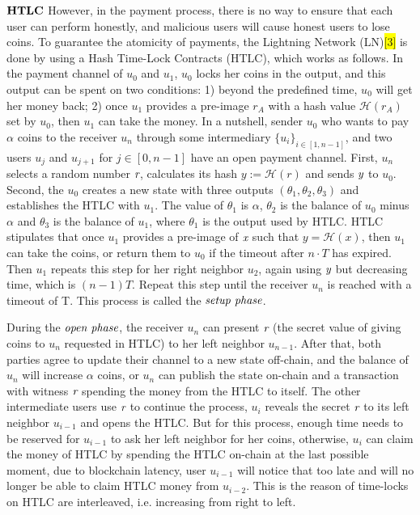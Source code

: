 \documentclass[conference]{IEEEtran}
\begin{document}
\noindent $\bf{HTLC}$ However, in the payment process, there is no way to ensure that each user can perform honestly, and malicious 
users will cause honest users to lose coins. To guarantee the atomicity of payments, the Lightning Network (LN)\colorbox{yellow}{[3]} 
is done by using a Hash Time-Lock Contracts (HTLC), which works as follows. In the payment channel of $u_0$ and $u_1$, $u_0$ locks her 
coins in the output, and this output can be spent on two conditions: 1) beyond the predefined time, $u_0$ will get her money back; 
2) once $u_1$ provides a pre-image $r_A$ with a hash value $\mathcal H(r_A)$ set by $u_0$, then $u_1$ can take the money. In a nutshell, 
sender $u_0$ who wants to pay $\alpha$ coins to the receiver $u_n$ through some intermediary ${\{u_i\}}_{i\in[1,n-1]}$, and two users 
$u_j$ and $u_{j+1}$ for $j \in [0,n-1]$ have an open payment channel. First, $u_n$ selects a random number $\emph{r}$, calculates its 
hash $y:= \mathcal H(r)$ and sends $\emph{y}$ to $u_0$. Second, the $u_0$ creates a new state with three outputs $(\theta_1, \theta_2, \theta_3)$ 
and establishes the HTLC with $u_1$. The value of $\theta_1$ is $\alpha$, $\theta_2$ is the balance of $u_0$ minus $\alpha$ and $\theta_3$ is 
the balance of $u_1$, where $\theta_1$ is the output used by HTLC. HTLC stipulates that once $u_1$ provides a pre-image of $\emph{x}$ such that 
$y = \mathcal H(x)$, then $u_1$ can take the coins, or return them to $u_0$ if the timeout after $n\cdot T$ has expired. Then $u_1$ repeats 
this step for her right neighbor $u_2$, again using $\emph{y}$ but decreasing time, which is $(n-1)T$. Repeat this step until the 
receiver $u_n$ is reached with a timeout of T. This process is called the $\emph{setup phase}$. 

During the $\emph{open phase}$, the receiver $u_n$ can present $\emph{r}$ (the secret value of giving coins to $u_n$ requested in HTLC) 
to her left neighbor $u_{n-1}$. After that, both parties agree to update their channel to a new state off-chain, and the balance of 
$u_n$ will increase $\alpha$ coins, or $u_n$ can publish the state on-chain and a transaction with witness $\emph{r}$ spending the 
money from the HTLC to itself. The other intermediate users use $\emph{r}$ to continue the process, $u_i$ reveals the secret $\emph{r}$ 
to its left neighbor $u_{i-1}$ and opens the HTLC. But for this process, enough time needs to be reserved for $u_{i-1}$ to ask her left 
neighbor for her coins, otherwise, $u_i$ can claim the money of HTLC by spending the HTLC on-chain at the last possible moment, due to 
blockchain latency, user $u_{i-1}$ will notice that too late and will no longer be able to claim HTLC money from $u_{i-2}$. This is the 
reason of time-locks on HTLC are interleaved, i.e. increasing from right to left.
\end{document}
